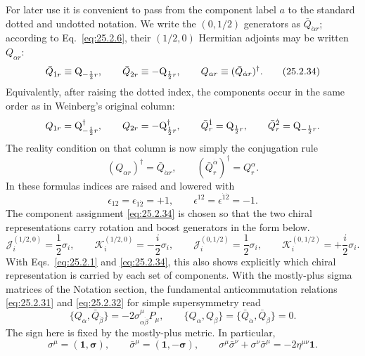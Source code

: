 For later use it is convenient to pass from the component label \(a\) to the
standard dotted and undotted notation.  We write the \((0,1/2)\) generators
as \(\bar Q_{\dot\alpha r}\); according to Eq.~\eqref{eq:25.2.6}, their
\((1/2,0)\) Hermitian adjoints may be written \(Q_{\alpha r}\):
\begin{equation}
\bar Q_{\dot 1 r}\equiv\mathrm{Q}_{-\frac12 r},
\qquad
\bar Q_{\dot 2 r}\equiv-\mathrm{Q}_{\frac12 r},
\qquad
Q_{\alpha r}\equiv(\bar Q_{\dot\alpha r})^\dagger.
\tag{25.2.34}\label{eq:25.2.34}
\end{equation}
Equivalently, after raising the dotted index, the components occur in the
same order as in Weinberg's original column:
\[
Q_{1r}=\mathrm{Q}_{-\frac12 r}^{\dagger},
\qquad
Q_{2r}=-\mathrm{Q}_{\frac12 r}^{\dagger},
\qquad
\bar Q^{\dot 1}_r=\mathrm{Q}_{\frac12 r},
\qquad
\bar Q^{\dot 2}_r=\mathrm{Q}_{-\frac12 r}.
\]
The reality condition on that column is now simply the conjugation rule
\[
(Q_{\alpha r})^\dagger=\bar Q_{\dot\alpha r},
\qquad
(\bar Q^{\dot\alpha}_r)^\dagger=Q^\alpha_r.
\]
In these formulas indices are raised and lowered with
\[
\epsilon_{12}=\epsilon_{\dot1\dot2}=+1,
\qquad
\epsilon^{12}=\epsilon^{\dot1\dot2}=-1.
\]
The component assignment \eqref{eq:25.2.34} is chosen so that the two
chiral representations carry rotation and boost generators in the form
below.
\begin{equation}
\mathcal J_i^{(1/2,0)}=\frac12\sigma_i,
\qquad
\mathcal K_i^{(1/2,0)}=-\frac i2\sigma_i,
\qquad
\mathcal J_i^{(0,1/2)}=\frac12\sigma_i,
\qquad
\mathcal K_i^{(0,1/2)}=+\frac i2\sigma_i.
\tag{25.2.35}\label{eq:25.2.35}
\end{equation}
With Eqs.~\eqref{eq:25.2.1} and \eqref{eq:25.2.34}, this also shows
explicitly which chiral representation is carried by each set of
components.
With the mostly-plus sigma matrices of the Notation section, the fundamental
anticommutation relations \eqref{eq:25.2.31} and \eqref{eq:25.2.32} for
simple supersymmetry read
\begin{equation}
\{Q_\alpha,\bar Q_{\dot\beta}\}
=-2\sigma^\mu_{\alpha\dot\beta}P_\mu,
\qquad
\{Q_\alpha,Q_\beta\}
=\{\bar Q_{\dot\alpha},\bar Q_{\dot\beta}\}=0.
\tag{25.2.36}\label{eq:25.2.36}
\end{equation}
The sign here is fixed by the mostly-plus metric.  In particular,
\begin{equation}
\sigma^\mu=(\mathbf{1},\boldsymbol{\sigma}),
\qquad
\bar\sigma^\mu=(\mathbf{1},-\boldsymbol{\sigma}),
\qquad
\sigma^\mu\bar\sigma^\nu+\sigma^\nu\bar\sigma^\mu
=-2\eta^{\mu\nu}\mathbf{1}.
\tag{25.2.37}\label{eq:25.2.37}
\end{equation}
